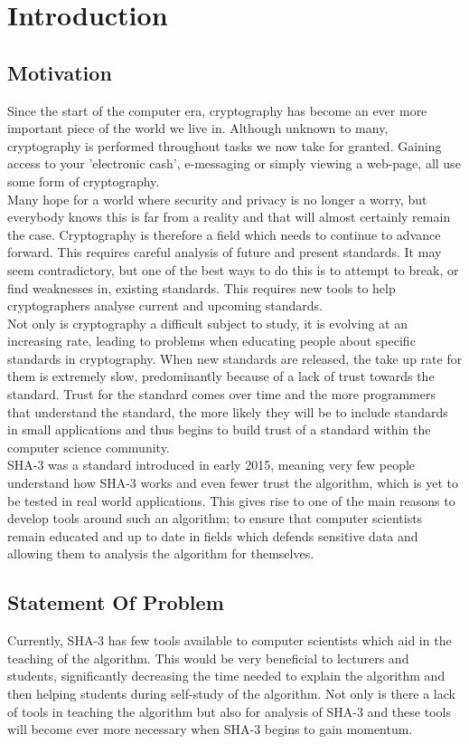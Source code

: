 \chapter{Introduction}
\section{Motivation}
Since the start of the computer era, cryptography has become an ever more important piece of the world we live in. Although unknown to many, cryptography is performed throughout tasks we now take for granted. Gaining access to your 'electronic cash', e-messaging or simply viewing a web-page, all use some form of cryptography.
\vspace{5 mm}\\
Many hope for a world where security and privacy is no longer a worry, but everybody knows this is far from a reality and that will almost certainly remain the case. Cryptography is therefore a field which needs to continue to advance forward. This requires careful analysis of future and present standards. It may seem contradictory, but one of the best ways to do this is to attempt to break, or find weaknesses in, existing standards. This requires new tools to help cryptographers analyse current and upcoming standards.
\vspace{5 mm}\\
Not only is cryptography a difficult subject to study, it is evolving at an increasing rate, leading to problems when educating people about specific standards in cryptography. When new standards are released, the take up rate for them is extremely slow, predominantly because of a lack of trust towards the standard. Trust for the standard comes over time and the more programmers that understand the standard, the more likely they will be to include standards in small applications and thus begins to build trust of a standard within the computer science community.
\vspace{5 mm}\\
SHA-3 was a standard introduced in early 2015, meaning very few people understand how SHA-3 works and even fewer trust the algorithm, which is yet to be tested in real world applications. This gives rise to one of the main reasons to develop tools around such an algorithm; to ensure that computer scientists remain educated and up to date in fields which defends sensitive data and allowing them to analysis the algorithm for themselves.
\section{Statement Of Problem}
\label{sec:StatementProb}
Currently, SHA-3 has few tools available to computer scientists which aid in the teaching of the algorithm. This would be very beneficial to lecturers and students, significantly decreasing the time needed to explain the algorithm and then helping students during self-study of the algorithm. Not only is there a lack of tools in teaching the algorithm but also for analysis of SHA-3 and these tools will become ever more necessary when SHA-3 begins to gain momentum.
